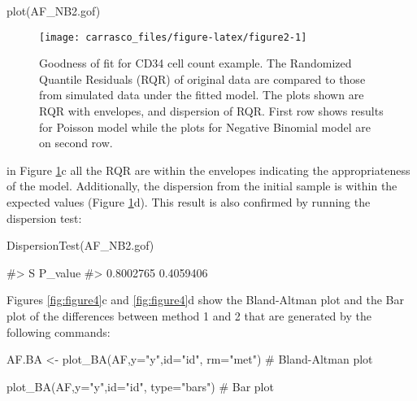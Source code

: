 \begin{Schunk}
\begin{Sinput}
plot(AF_NB2.gof)
\end{Sinput}
\end{Schunk}

\begin{Schunk}
\begin{figure}
\texttt{[image: carrasco\_files/figure-latex/figure2-1]} \caption[Goodness of fit for CD34 cell count example]{Goodness of fit for CD34 cell count example. The Randomized Quantile Residuals (RQR) of original data are compared to those from simulated data under the fitted model. The plots shown are RQR with envelopes, and dispersion of RQR. First row shows results for Poisson model while the plots for Negative Binomial model are on second row.}\label{fig:figure2}
\end{figure}
\end{Schunk}

in Figure \ref{fig:figure2}c all the RQR are within the envelopes
indicating the appropriateness of the model. Additionally, the
dispersion from the initial sample is within the expected values (Figure
\ref{fig:figure2}d). This result is also confirmed by running the
dispersion test:

\begin{Schunk}
\begin{Sinput}
DispersionTest(AF_NB2.gof)
\end{Sinput}
\begin{Soutput}
#>          S   P_value
#>  0.8002765 0.4059406
\end{Soutput}
\end{Schunk}

Figures \ref{fig:figure4}c and \ref{fig:figure4}d show the Bland-Altman
plot and the Bar plot of the differences between method 1 and 2 that are
generated by the following commands:

\begin{Schunk}
\begin{Sinput}
AF.BA <- plot_BA(AF,y="y",id="id", rm="met") # Bland-Altman plot
\end{Sinput}
\end{Schunk}

\begin{Schunk}
\begin{Sinput}
plot_BA(AF,y="y",id="id", type="bars") # Bar plot
\end{Sinput}
\end{Schunk}

